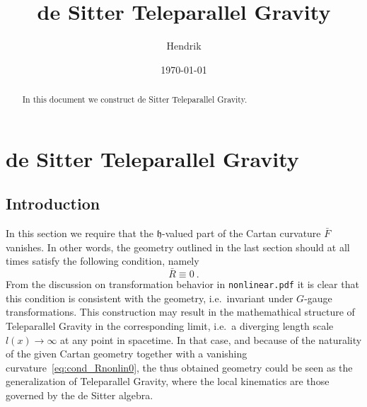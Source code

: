 \documentclass[11pt]{article}
\title{de Sitter Teleparallel Gravity}
\author{Hendrik}
\date{\today}
\begin{document}
\maketitle

\begin{abstract}
	In this document we construct de Sitter Teleparallel Gravity.
\end{abstract}

\section{de Sitter Teleparallel Gravity}

\subsection{Introduction}

In this section we require that the $\mathfrak{h}$-valued part of 
the Cartan curvature $\bar{F}$ vanishes. In other words, the 
geometry outlined in the last section should at all times satisfy 
the following condition, namely
\begin{equation}
	\label{eq:cond_Rnonlin0}
	\bar{R} \equiv 0~.
\end{equation}
From the discussion on transformation behavior in 
\verb+nonlinear.pdf+  it is clear that this condition is 
consistent with the geometry, i.e.~invariant under $G$-gauge 
transformations. This construction may result in the 
mathemathical structure of Teleparallel Gravity in the 
corresponding limit, i.e.~a diverging length scale $l(x) \to 
\infty$ at any point in spacetime. In that case, and because of 
the naturality of the given Cartan geometry together with a 
vanishing curvature~\eqref{eq:cond_Rnonlin0}, the thus obtained 
geometry could be seen as the generalization of Teleparallel 
Gravity, where the local kinematics are those governed by the de 
Sitter algebra.
\end{document}
